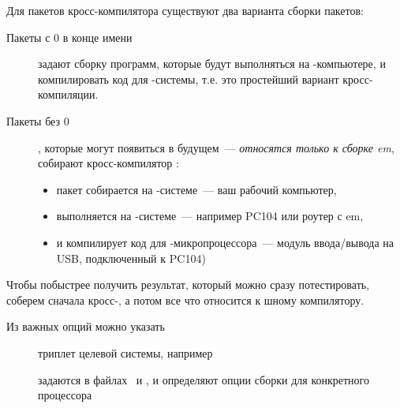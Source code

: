 



\secdown

Для пакетов кросс-компилятора существуют два варианта сборки пакетов:

\begin{description}

\item[Пакеты с 0 в конце имени] задают сборку программ, которые будут
выполняться на -компьютере, и компилировать код для -системы, т.е. это
простейший вариант кросс-компиляции.

\item[Пакеты без 0], которые могут появиться в будущем\ --- \emph{относятся
только к сборке em\linux}, собирают кросс-компилятор :

\begin{itemize}[nosep]
\item пакет собирается на -системе\ --- ваш рабочий компьютер,
\item выполняется на -системе\ --- например PC104 или роутер с
em\linux,
\item и компилирует код для -микропроцессора\ --- модуль
ввода/вывода на USB, подключенный к PC104)
\end{itemize}
 
\end{description}


Чтобы побыстрее получить результат, который можно сразу потестировать, соберем
сначала кросс-, а потом все что относится к \ci шному
компилятору.

Из важных опций можно указать

\begin{description}
\item[] триплет целевой системы, например 
\item[] задаются в файлах \ и
, и определяют опции сборки  для
конкретного процессора
\end{description}

